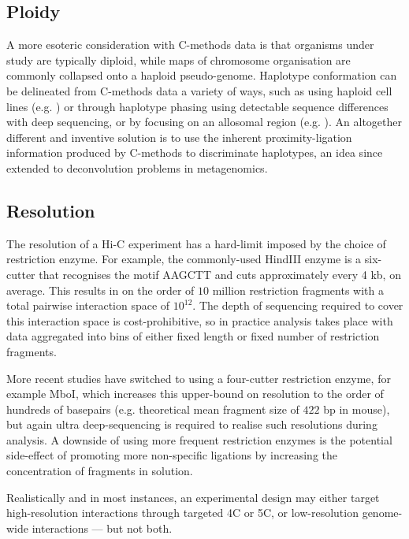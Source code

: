 \documentclass[a4paper,11pt,oneside]{book}
\begin{document}
\subsection{Ploidy}
A more esoteric consideration with C-methods data is that organisms under study are typically diploid, while maps of chromosome organisation are commonly collapsed onto a haploid pseudo-genome. Haplotype conformation can be delineated from C-methods data a variety of ways, such as using haploid cell lines (e.g. ) or through haplotype phasing using detectable sequence differences with deep sequencing, or by focusing on an allosomal region (e.g. ). An altogether different and inventive solution is to use the inherent proximity-ligation information produced by C-methods to discriminate haplotypes,\cite{Selvaraj2013a} an idea since extended to deconvolution problems in metagenomics.\cite{Burton2014, Beitel2014}

\subsection{Resolution}
The resolution of a Hi-C experiment has a hard-limit imposed by the choice of restriction enzyme. For example, the commonly-used HindIII enzyme is a six-cutter that recognises the motif AAGCTT and cuts approximately every 4 kb, on average.\cite{DeWit2012} This results in on the order of $10$ million restriction fragments with a total pairwise interaction space of $10^{12}$.\cite{Lajoie2014} The depth of sequencing required to cover this interaction space is cost-prohibitive, so in practice analysis takes place with data aggregated into bins of either fixed length or fixed number of restriction fragments. 

More recent studies have switched to using a four-cutter restriction enzyme, for example MboI,\cite{Rao2014} which increases this upper-bound on resolution to the order of hundreds of basepairs (e.g. theoretical mean fragment size of $422$ bp in mouse\cite{Sahlen2015}), but again ultra deep-sequencing is required to realise such resolutions during analysis. A downside of using more frequent restriction enzymes is the potential side-effect of promoting more non-specific ligations by increasing the concentration of fragments in solution.\cite{Rao2014} 

Realistically and in most instances, an experimental design may either target high-resolution interactions through targeted 4C or 5C, or low-resolution genome-wide interactions --- but not both.
\end{document}
